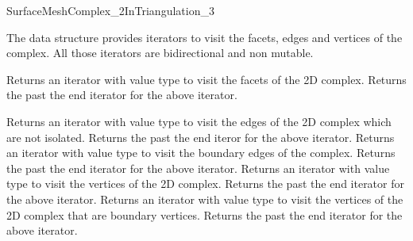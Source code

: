 \begin{ccRefConcept}{SurfaceMeshComplex_2InTriangulation_3}






The data structure provides iterators  to visit  
the facets, edges and vertices of the complex.
All those iterators are bidirectional and
non mutable.

{Returns an iterator with value type  to visit the facets
of the 2D complex.}
\ccGlue
{}
{Returns the  past the end iterator for the above iterator.}

{Returns an iterator with value type  to visit the
edges of the 2D complex which are not isolated.}
\ccGlue
{}
{Returns the past the end iteror for the above iterator.}
\ccGlue
{}
{Returns an iterator with value type  to visit the
boundary  edges of the complex.}
\ccGlue
{}
{Returns the past the end iterator for the above iterator.}
\ccGlue
{}
{Returns an iterator with value type  to visit the
vertices of the 2D complex.}
\ccGlue
{}
{Returns the past the end iterator for the above iterator.}
\ccGlue
{}
{Returns an iterator with value type  to visit the 
vertices of the 2D complex that are  boundary vertices.}
\ccGlue
{}
{Returns the past the end iterator for the above iterator.}



\end{ccRefConcept}
